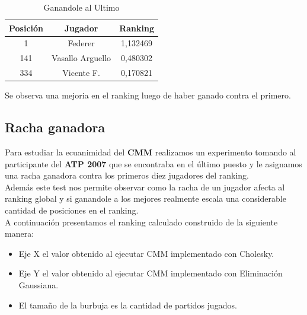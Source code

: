 \begin{table}[H]
\caption{Ganandole al Ultimo}
\centering
\begin{tabular}{c c c}
\hline \hline
    Posición & Jugador & Ranking \\ 
    \hline
    1 & Federer & 1,132469 \\ 
    141 & Vasallo Arguello & 0,480302 \\ 
    334 & Vicente F. & 0,170821 \\ 
    \hline
    \end{tabular}
\end{table}

\newline

Se observa una mejoria en el ranking luego de haber ganado contra el primero.
\\

\subsection{Racha ganadora}

Para estudiar la ecuanimidad del \textbf{CMM} realizamos un experimento tomando al participante del \textbf{ATP 2007} que se encontraba en el último puesto y le asignamos una racha ganadora contra los primeros diez jugadores del ranking. \\

Además este test nos permite observar como la racha de un jugador afecta al ranking global y si ganandole a los mejores realmente escala una considerable cantidad de posiciones en el ranking. \\

A continuación presentamos el ranking calculado construido de la siguiente manera: \\

\begin{itemize}
	\item Eje X el valor obtenido al ejecutar CMM implementado con Cholesky.
	\item Eje Y el valor obtenido al ejecutar CMM implementado con Eliminación Gaussiana.
	\item El tamaño de la burbuja es la cantidad de partidos jugados.
\end{itemize}

\\

